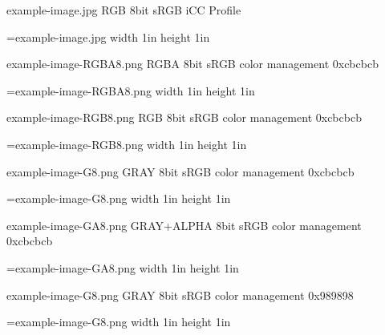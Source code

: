 example-image.jpg RGB 8bit sRGB iCC Profile

\HINTimage=example-image.jpg width 1in height 1in \relax\par

example-image-RGBA8.png RGBA 8bit sRGB color management 0xcbcbcb

\HINTimage=example-image-RGBA8.png width 1in height 1in \relax\par

example-image-RGB8.png RGB 8bit sRGB color management 0xcbcbcb

\HINTimage=example-image-RGB8.png width 1in height 1in \relax\par

example-image-G8.png GRAY 8bit sRGB color management 0xcbcbcb

\HINTimage=example-image-G8.png width 1in height 1in \relax 

example-image-GA8.png GRAY+ALPHA 8bit sRGB color management 0xcbcbcb

\HINTimage=example-image-GA8.png width 1in height 1in \relax

example-image-G8.png GRAY 8bit sRGB color management 0x989898

\HINTimage=example-image-G8.png width 1in height 1in \relax

\vfill
\bye
